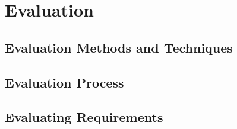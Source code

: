 \chapter{Evaluation}
\label{chap:evaluation}

\section{Evaluation Methods and Techniques}
\label{evaluation:methods-and-technicques}

\section{Evaluation Process}
\label{evaluation:process}

\section{Evaluating Requirements}
\label{evaluation:requirements}

